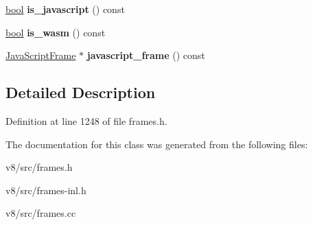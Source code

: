 \begin{DoxyCompactItemize}
\item 
\mbox{\label{classv8_1_1internal_1_1StackTraceFrameIterator_a0c881fbecde825475d6568780d7391bf}} 
\mbox{\hyperlink{classbool}{bool}} {\bfseries is\+\_\+javascript} () const
\item 
\mbox{\label{classv8_1_1internal_1_1StackTraceFrameIterator_a07fde1491f968378120d2f24b664e820}} 
\mbox{\hyperlink{classbool}{bool}} {\bfseries is\+\_\+wasm} () const
\item 
\mbox{\label{classv8_1_1internal_1_1StackTraceFrameIterator_a6bb78c84ce04cf9313c841ca7ddbf923}} 
\mbox{\hyperlink{classv8_1_1internal_1_1JavaScriptFrame}{Java\+Script\+Frame}} $\ast$ {\bfseries javascript\+\_\+frame} () const
\end{DoxyCompactItemize}


\subsection{Detailed Description}


Definition at line 1248 of file frames.\+h.



The documentation for this class was generated from the following files\+:\begin{DoxyCompactItemize}
\item 
v8/src/frames.\+h\item 
v8/src/frames-\/inl.\+h\item 
v8/src/frames.\+cc\end{DoxyCompactItemize}
